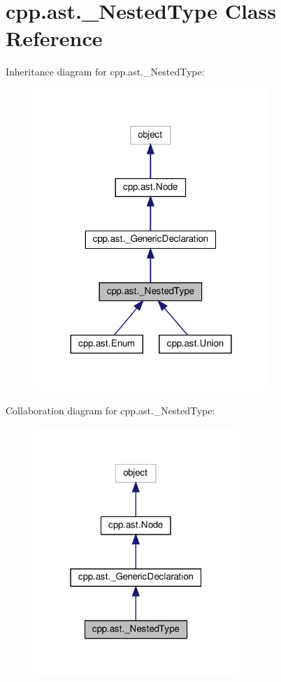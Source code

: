 \hypertarget{classcpp_1_1ast_1_1___nested_type}{}\section{cpp.\+ast.\+\_\+\+Nested\+Type Class Reference}
\label{classcpp_1_1ast_1_1___nested_type}


Inheritance diagram for cpp.\+ast.\+\_\+\+Nested\+Type\+:
\nopagebreak
\begin{figure}[H]
\begin{center}
\leavevmode
\includegraphics[width=252pt]{classcpp_1_1ast_1_1___nested_type__inherit__graph}
\end{center}
\end{figure}


Collaboration diagram for cpp.\+ast.\+\_\+\+Nested\+Type\+:
\nopagebreak
\begin{figure}[H]
\begin{center}
\leavevmode
\includegraphics[width=220pt]{classcpp_1_1ast_1_1___nested_type__coll__graph}
\end{center}
\end{figure}
